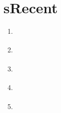 \NEWMOD

\section{sRecent}



\begin{frame}[fragile,label=s-recent] 
\modframetitle{\sRecent}
\small
\begin{center}
\begin{minipage}{3.25in}
\begin{enumerate}
\item \hyperlink{ss-recent-particles<1>}   {\BUTTON {\ssRecentParticles}}
\item \hyperlink{ss-recent-gravity<1>}     {\BUTTON {\ssRecentGravity}}
\item \hyperlink{ss-recent-history<1>}     {\BUTTON {\ssRecentHistory}}
\item \hyperlink{ss-recent-units<1>}       {\BUTTON {\ssRecentUnits}}
\item \hyperlink{ss-recent-cosmology<1>}       {\BUTTON {\ssRecentCosmology}}
\end{enumerate}
\end{minipage}
\end{center}
\end{frame}


